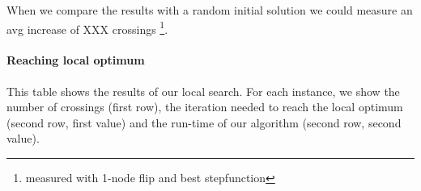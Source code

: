 \documentclass{scrartcl}
\begin{document}
When we compare the results with a random initial solution we could
measure an avg increase of XXX crossings 
\footnote{measured with 1-node flip and best stepfunction}.

\paragraph{Reaching local optimum}











\begin{landscape}
\begin{table}
  \scriptsize
  
\caption{This table shows the results of our local search. For each instance, we show the number of crossings (first row), the iteration 
needed to reach the local optimum (second row, first value) and the run-time of our algorithm (second row, second value).}
\label{tab:results}
\end{table}
\end{landscape}
\end{document}
